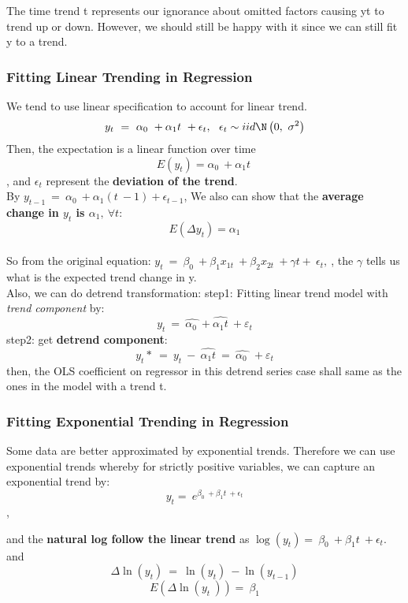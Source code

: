 \documentclass[12pt]{article}
\begin{document}
The time trend t represents our ignorance about omitted factors causing yt to trend up or down. However, we should still be happy with it since we can still fit y to a trend.
\\

{\color{RoyalBlue}
\subsubsection{Fitting Linear Trending in Regression }}
We tend to use linear specification to account for linear trend.
$$y_t\ =\ \alpha _0\ +\alpha _1t\ +\epsilon _t, \ \   \epsilon_t \sim iid \N\left(0,\ \sigma^2\right)$$
Then, the expectation is a linear function over time 
$$E(y_t) = \alpha _0\ +\alpha _1t\ $$, and $\epsilon _t$ represent the \textbf{deviation of the trend}. \\
By $y_{t-1}\ =\ \alpha_0\ +\alpha_1\left(t\ -1\right)+\epsilon_{t-1}$, We also can show that the \textbf{average change in $y_t$ is $\alpha _1,\ \forall t $}:
$$E(\Delta y_t) = \alpha _1 $$
\\
So from the original equation: $y_t\ =\ \beta_0\ +\beta_1x_{1t}\ +\beta_2x_{2t}\ +\gamma t +\ \epsilon_t,\ $, the $\gamma$ tells us what is the expected trend change in y.
\\

Also, we can do detrend transformation:
\noindent
step1: Fitting linear trend model with \textit{trend component} by:
$$y_t\ =\ \hat{\alpha _0\ }+\hat{\alpha _1t}\ +\varepsilon _t$$
\noindent
step2: get \textbf{detrend component}:
$$y_t\ast \ =\ y_t\ -\ \hat{\alpha _1t}\ =\ \hat{\alpha _0\ }\ +\varepsilon _t$$
then, the OLS coefficient on regressor in this detrend series case shall same as the ones in the model with a trend t.
\\

{\color{RoyalBlue}
\subsubsection{Fitting Exponential Trending in Regression }}
Some data are better approximated by exponential trends. Therefore we can use exponential trends whereby for strictly positive variables, we can capture an exponential trend by: $$y_t=\ e^{\beta_0\ +\beta_1t\ +\epsilon_t}$$, 

and the \textbf{natural log follow the linear trend} as $\log\left(y_t\right)=\ \beta_0\ +\beta_1t\ +\epsilon_t$. and 
$$\Delta\ln\left(y_t\right)\ =\ \ln\left(y_t\right)\ -\ln\left(y_{t-1}\right)$$
$$E\left(\Delta\ln\left(y_t\ \right)\right)=\ \beta_1$$
\end{document}
